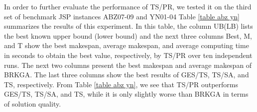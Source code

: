 \documentclass[authoryear,12pt]{elsarticle}
\begin{document}
\begin{table}[!h]
\begin{scriptsize}
\caption{Computational results and comparisons for the third set of instances ABZ07-09 and YN01-04}
\label{table abz yn}
\end{scriptsize}
\end{table}


In order to further evaluate the performance of TS/PR, we tested it on the third set of benchmark JSP instances ABZ07-09 and YN01-04
Table \ref{table abz yn} summarizes the results of this experiment. In this table, the column UB(LB) lists the best known upper bound (lower bound) and the next three columns Best, M, and T show the best makespan, average makespan, and average computing time in seconds to obtain the best value, respectively, by TS/PR over ten independent runs. The next two columns present the best makespan and average makespan of BRKGA. The last three columns show the best results of GES/TS, TS/SA, and TS, respectively. From Table \ref{table abz yn}, we see that TS/PR outperforms GES/TS, TS/SA, and TS, while it is only slightly worse than BRKGA in terms of solution quality.
\end{document}
